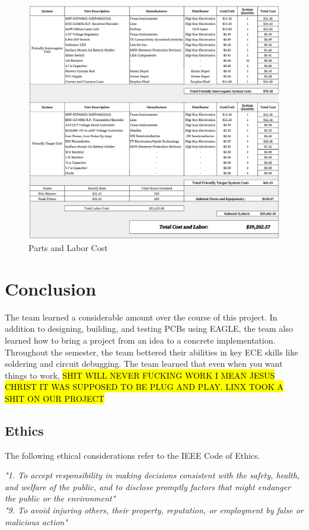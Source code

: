 \documentclass[letterpaper,10pt]{article}
\begin{document}
\begin{spacing}{1.15}
\begin{figure} [H]
	\centering
	\includegraphics[scale=0.60]{parts-labor-cost.png}
	\caption{Parts and Labor Cost\label{fig:parts-labor-cost}}
\end{figure}



\section{Conclusion}
The team learned a considerable amount over the course of this project. In addition to designing, building, and testing PCBs using EAGLE, the team also learned how to bring a project from an idea to a concrete implementation. Throughout the semester, the team bettered their abilities in key ECE skills like soldering and circuit debugging. The team learned that even when you want things to work, \hl{SHIT WILL NEVER FUCKING WORK I MEAN JESUS CHRIST IT WAS SUPPOSED TO BE PLUG AND PLAY. LINX TOOK A SHIT ON OUR PROJECT}

\subsection{Ethics}
The following ethical considerations refer to the IEEE Code of Ethics\cite{IEEE}.

\textit{"1. To accept responsibility in making decisions consistent with the safety, health, and welfare of the public, and to disclose promptly factors that might endanger the public or the environment"} \\
\textit{"9. To avoid injuring others, their property, reputation, or employment by false or malicious action"}


\end{spacing}
\end{document}
